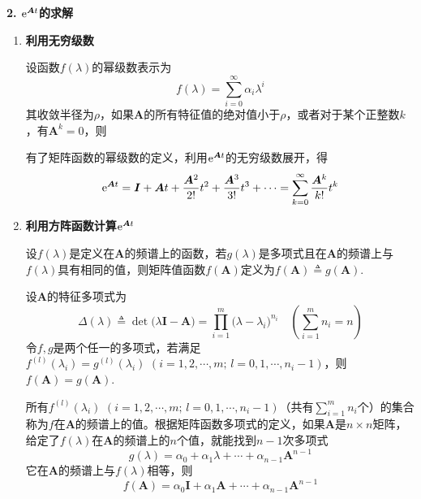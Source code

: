 \noindent \textbf{2. ${\rm{e}}^{\bm{A}t}$的求解}
\begin{enumerate}[\hspace*{1em} (1) ]
	\item \textbf{利用无穷级数}
	
	 设函数$f(\lambda)$的幂级数表示为
	 \begin{equation}
	 	f(\lambda) = \sum_{i = 0}^{\infty} \alpha_i \lambda^i
	 \end{equation}
	其收敛半径为$\rho$，如果$\bm{A}$的所有特征值的绝对值小于$\rho$，或者对于某个正整数$k$，有$\bm{A}^k = 0$，则
	
	有了矩阵函数的幂级数的定义，利用${\rm{e}}^{\bm{A}t}$的无穷级数展开，得
	\begin{equation}
		{\rm{e}}^{\bm{A}t} = \bm{I} + \bm{A}t + \dfrac{\bm{A}^2}{2!}t^2 + \dfrac{\bm{A}^3}{3!}t^3 + \cdots = \sum_{k=0}^{\infty} \dfrac{\bm{A}^k}{k!}t^k
	\end{equation}

	\item \textbf{利用方阵函数计算${\rm{e}}^{\bm{A}t}$}
	
	\hspace*{2em} 设$f(\lambda)$是定义在$\bm{A}$的频谱上的函数，若$g(\lambda)$是多项式且在$\bm{A}$的频谱上与$f(\lambda)$具有相同的值，则矩阵值函数$f(\bm{A})$定义为$f(\bm{A}) \triangleq g(\bm{A})$.
	
	设$\bm{A}$的特征多项式为
	\begin{equation}
		\Delta (\lambda) \triangleq \det\big(\lambda \bm{I} - \bm{A}\big) = \prod_{i=1}^{m}\big(\lambda - \lambda_i\big)^{n_i}\quad \left(\sum_{i = 1}^{m}n_i = n\right)
	\end{equation}
	令$f,g$是两个任一的多项式，若满足$f^{(l)}(\lambda_i)= g^{(l)}(\lambda_i)\,\,(i=1,2,\cdots,m;\, l=0,1,\cdots, n_i-1)$，则$f(\bm{A}) = g(\bm{A})$.
	
	所有$f^{(l)}(\lambda_i)\,\,(i=1,2,\cdots,m;\, l=0,1,\cdots, n_i-1)$（共有$\displaystyle \sum_{i=1}^{m}n_i$个）的集合称为$f$在$\bm{A}$的频谱上的值。根据矩阵函数多项式的定义，如果$\bm{A}$是$n \times n$矩阵，给定了$f(\lambda)$在$\bm{A}$的频谱上的$n$个值，就能找到$n-1$次多项式
	\begin{equation}
		g(\lambda) = \alpha_0 + \alpha_1\lambda + \cdots + \alpha_{n-1}\bm{A}^{n-1}
	\end{equation}
	它在$\bm{A}$的频谱上与$f(\lambda)$相等，则
	\begin{equation}
		f(\bm{A}) = \alpha_0 \bm{I} + \alpha_1 \bm{A} + \cdots + \alpha_{n-1}\bm{A}^{n-1}
	\end{equation}


\end{enumerate}
